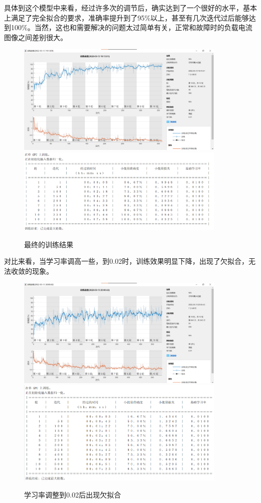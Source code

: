 \documentclass{article}
\begin{document}
	具体到这个模型中来看，经过许多次的调节后，确实达到了一个很好的水平，基本上满足了完全拟合的要求，准确率提升到了95\%以上，甚至有几次迭代过后能够达到100\%。当然，这也和需要解决的问题太过简单有关，正常和故障时的负载电流图像之间差别很大。
	
	\begin{figure}[htpb]
		\centering
		\includegraphics[width=10cm]{figure/2nd.png}
		\includegraphics[width=10cm]{figure/2nd_table.png}
		\caption{最终的训练结果}
	\end{figure}
	
	对比来看，当学习率调高一些，到0.02时，训练效果明显下降，出现了欠拟合，无法收敛的现象。
	
	\begin{figure}[htpb]
		\centering
		\includegraphics[width=10cm]{figure/4th.png}
		\includegraphics[width=10cm]{figure/4th_table.png}
		\caption{学习率调整到0.02后出现欠拟合}
	\end{figure}
	
\end{document}
